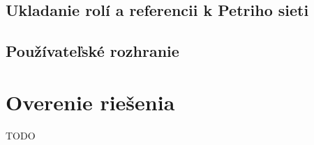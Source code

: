 \subsection{Ukladanie rolí a referencii k Petriho sieti}




\subsection{Používateľské rozhranie}



\section{Overenie riešenia}
TODO